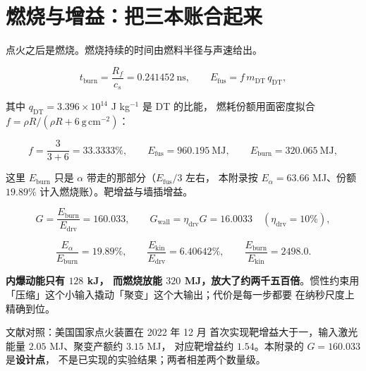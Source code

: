 \section{燃烧与增益：把三本账合起来}
\label{sec:app-ai-burn}

点火之后是燃烧。燃烧持续的时间由燃料半径与声速给出。

\begin{equation}
t_{\mathrm{burn}} = \frac{R_f}{c_s} = 0.241452\ \mathrm{ns},
\qquad
E_{\mathrm{fus}} = f\, m_{\mathrm{DT}}\, q_{\mathrm{DT}},
\label{eq:app-ai-burn}
\end{equation}

其中 $q_{\mathrm{DT}} = 3.396\times10^{14}$ J kg$^{-1}$ 是 DT 的比能，
燃耗份额用面密度拟合 $f = \rho R/(\rho R + 6\ \mathrm{g\,cm^{-2}})$：

\begin{equation}
f = \frac{3}{3+6} = 33.3333\%,
\qquad
E_{\mathrm{fus}} = 960.195\ \mathrm{MJ},
\qquad
E_{\mathrm{burn}} = 320.065\ \mathrm{MJ},
\label{eq:app-ai-gain}
\end{equation}

这里 $E_{\mathrm{burn}}$ 只是 $\alpha$ 带走的那部分（$E_{\mathrm{fus}}/3$ 左右，
本附录按 $E_\alpha = 63.66$ MJ、份额 $19.89\%$ 计入燃烧账）。靶增益与墙插增益。

\begin{equation}
G = \frac{E_{\mathrm{burn}}}{E_{\mathrm{drv}}} = 160.033,
\qquad
G_{\mathrm{wall}} = \eta_{\mathrm{drv}} G = 16.0033 \quad (\eta_{\mathrm{drv}} = 10\%),
\label{eq:app-ai-wall}
\end{equation}

\begin{equation}
\frac{E_\alpha}{E_{\mathrm{burn}}} = 19.89\%,
\qquad
\frac{E_{\mathrm{kin}}}{E_{\mathrm{drv}}} = 6.40642\%,
\qquad
\frac{E_{\mathrm{burn}}}{E_{\mathrm{kin}}} = 2498.0 .
\label{eq:app-ai-frac}
\end{equation}

\textbf{内爆动能只有 $128$ kJ，
而燃烧放能 $320$ MJ，放大了约两千五百倍}。惯性约束用「压缩」这个小输入撬动「聚变」这个大输出；代价是每一步都要
在纳秒尺度上精确到位。

文献对照：美国国家点火装置在 2022 年 12 月
首次实现靶增益大于一，输入激光能量 $2.05$ MJ、聚变产额约 $3.15$ MJ，
对应靶增益约 $1.54$。本附录的 $G = 160.033$ 是\textbf{设计点}，
不是已实现的实验结果；两者相差两个数量级。

